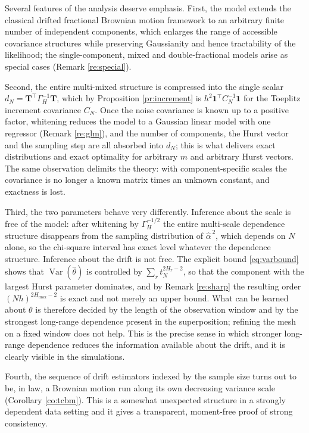 \documentclass[11pt,reqno]{amsart}
\numberwithin{equation}{section}
\theoremstyle{plain}
\theoremstyle{definition}
\theoremstyle{remark}
\newcommand{\bT}{\mathbf{T}}
\newcommand{\bone}{\mathbf{1}}
\newcommand{\GH}{\Gamma_H}
\newcommand{\Hmax}{H_{\max}}
\DeclareMathOperator{\Var}{Var}
\begin{document}
Several features of the analysis deserve emphasis. First, the model extends the classical
drifted fractional Brownian motion framework to an arbitrary finite number of independent
components, which enlarges the range of accessible covariance structures while preserving
Gaussianity and hence tractability of the likelihood; the single-component, mixed and
double-fractional models arise as special cases (Remark \ref{re:special}).

Second, the entire multi-mixed structure is compressed into the single scalar
$d_N=\bT^{\top}\GH^{-1}\bT$, which by Proposition \ref{pr:increment} is
$h^{2}\bone^{\top}C_N^{-1}\bone$ for the Toeplitz increment covariance $C_N$. Once the
noise covariance is known up to a positive factor, whitening reduces the model to a
Gaussian linear model with one regressor (Remark \ref{re:glm}), and the number of
components, the Hurst vector and the sampling step are all absorbed into $d_N$; this is
what delivers exact distributions and exact optimality for arbitrary $m$ and arbitrary
Hurst vectors. The same observation delimits the theory: with component-specific scales
the covariance is no longer a known matrix times an unknown constant, and exactness is
lost.

Third, the two parameters behave very differently. Inference about the scale is free of
the model: after whitening by $\GH^{-1/2}$ the entire multi-scale dependence structure
disappears from the sampling distribution of $\widehat\alpha^{\,2}$, which depends on $N$
alone, so the chi-square interval has exact level whatever the dependence structure.
Inference about the drift is not free. The explicit bound \eqref{eq:varbound} shows that
$\Var(\widehat\theta)$ is controlled by $\sum_rt_N^{2H_r-2}$, so that the component with
the largest Hurst parameter dominates, and by Remark \ref{re:sharp} the resulting order
$(Nh)^{2\Hmax-2}$ is exact and not merely an upper bound. What can be learned about
$\theta$ is therefore decided by the length of the observation window and by the
strongest long-range dependence present in the superposition; refining the mesh on a
fixed window does not help. This is the precise sense in which stronger long-range
dependence reduces the information available about the drift, and it is clearly visible
in the simulations.

Fourth, the sequence of drift estimators indexed by the sample size turns out to be, in
law, a Brownian motion run along its own decreasing variance scale
(Corollary \ref{co:tcbm}). This is a somewhat unexpected structure in a strongly
dependent data setting and it gives a transparent, moment-free proof of strong
consistency.
\end{document}
